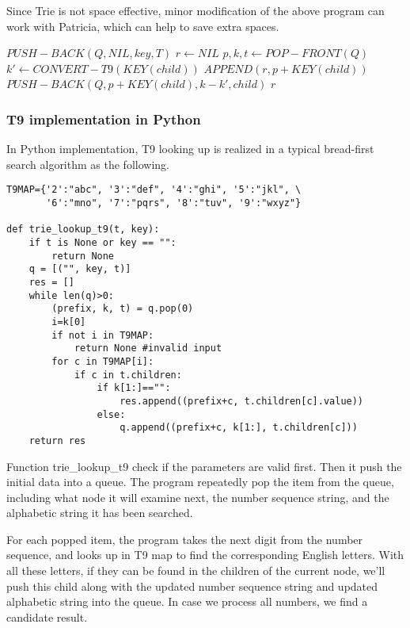 \documentclass{article}
\begin{document}
Since Trie is not space effective, minor modification of the above program can
work with Patricia, which can help to save extra spaces.

\begin{algorithmic}[1]
  \State $PUSH-BACK(Q, NIL, key, T)$
  \State $r \leftarrow NIL$
    \State $p, k, t \leftarrow POP-FRONT(Q)$
      \State $k' \leftarrow CONVERT-T9(KEY(child))$
          \State $APPEND(r, p+KEY(child))$
        \Else
          \State $PUSH-BACK(Q, p+KEY(child), k-k', child)$
        \EndIf
      \EndIf
    \EndFor
  \EndWhile
  \State \Return $r$
\EndFunction
\end{algorithmic}

\subsubsection*{T9 implementation in Python}

In Python implementation, T9 looking up is realized in a typical bread-first search algorithm as the following.

\lstset{language=Python}
\begin{lstlisting}
T9MAP={'2':"abc", '3':"def", '4':"ghi", '5':"jkl", \
       '6':"mno", '7':"pqrs", '8':"tuv", '9':"wxyz"}

def trie_lookup_t9(t, key):
    if t is None or key == "":
        return None
    q = [("", key, t)]
    res = []
    while len(q)>0:
        (prefix, k, t) = q.pop(0)
        i=k[0]
        if not i in T9MAP:
            return None #invalid input
        for c in T9MAP[i]:
            if c in t.children:
                if k[1:]=="":
                    res.append((prefix+c, t.children[c].value))
                else:
                    q.append((prefix+c, k[1:], t.children[c]))
    return res
\end{lstlisting}

Function trie\_lookup\_t9 check if the parameters are valid first. Then
it push the initial data into a queue. The program repeatedly pop the item
from the queue, including what node it will examine next, the number sequence
string, and the alphabetic string it has been searched.

For each popped item, the program takes the next digit from the number
sequence, and looks up in T9 map to find the corresponding English letters.
With all these letters, if they can be found in the children of the current
node, we'll push this child along with the updated number sequence string
and updated alphabetic string into the queue. In case we process all
numbers, we find a candidate result.
\end{document}

